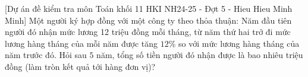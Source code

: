 \begin{bt}%
[Dự án đề kiểm tra môn Toán khối 11 HKI NH24-25 - Đợt 5 - Hieu Hieu Minh Minh]%
	Một người ký hợp đồng với một công ty theo thỏa thuận: Năm đầu tiên người đó nhận mức lương 12 triệu đồng mỗi tháng, từ năm thứ hai trở đi mức lương hàng tháng của mỗi năm được tăng $12\%$ so với mức lương hàng tháng của năm trước đó. Hỏi sau $5$ năm, tổng số tiền người đó nhận được là bao nhiêu triệu đồng (làm tròn kết quả tới hàng đơn vị)?
\end{bt}

